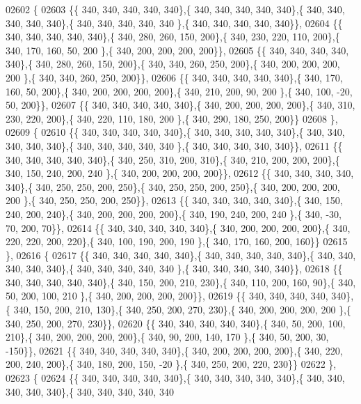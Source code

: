 \begin{DoxyCode}
02602 \{
02603 \{\{ 340, 340, 340, 340, 340\},\{ 340, 340, 340, 340, 340\},\{ 340, 340, 340, 340, 340\},\{ 340, 340, 340, 340, 340
      \},\{ 340, 340, 340, 340, 340\}\},
02604 \{\{ 340, 340, 340, 340, 340\},\{ 340, 280, 260, 150, 200\},\{ 340, 230, 220, 110, 200\},\{ 340, 170, 160,  50, 200
      \},\{ 340, 200, 200, 200, 200\}\},
02605 \{\{ 340, 340, 340, 340, 340\},\{ 340, 280, 260, 150, 200\},\{ 340, 340, 260, 250, 200\},\{ 340, 200, 200, 200, 200
      \},\{ 340, 340, 260, 250, 200\}\},
02606 \{\{ 340, 340, 340, 340, 340\},\{ 340, 170, 160,  50, 200\},\{ 340, 200, 200, 200, 200\},\{ 340, 210, 200,  90, 200
      \},\{ 340, 100, -20,  50, 200\}\},
02607 \{\{ 340, 340, 340, 340, 340\},\{ 340, 200, 200, 200, 200\},\{ 340, 310, 230, 220, 200\},\{ 340, 220, 110, 180, 200
      \},\{ 340, 290, 180, 250, 200\}\}
02608 \},
02609 \{
02610 \{\{ 340, 340, 340, 340, 340\},\{ 340, 340, 340, 340, 340\},\{ 340, 340, 340, 340, 340\},\{ 340, 340, 340, 340, 340
      \},\{ 340, 340, 340, 340, 340\}\},
02611 \{\{ 340, 340, 340, 340, 340\},\{ 340, 250, 310, 200, 310\},\{ 340, 210, 200, 200, 200\},\{ 340, 150, 240, 200, 240
      \},\{ 340, 200, 200, 200, 200\}\},
02612 \{\{ 340, 340, 340, 340, 340\},\{ 340, 250, 250, 200, 250\},\{ 340, 250, 250, 200, 250\},\{ 340, 200, 200, 200, 200
      \},\{ 340, 250, 250, 200, 250\}\},
02613 \{\{ 340, 340, 340, 340, 340\},\{ 340, 150, 240, 200, 240\},\{ 340, 200, 200, 200, 200\},\{ 340, 190, 240, 200, 240
      \},\{ 340, -30,  70, 200,  70\}\},
02614 \{\{ 340, 340, 340, 340, 340\},\{ 340, 200, 200, 200, 200\},\{ 340, 220, 220, 200, 220\},\{ 340, 100, 190, 200, 190
      \},\{ 340, 170, 160, 200, 160\}\}
02615 \},
02616 \{
02617 \{\{ 340, 340, 340, 340, 340\},\{ 340, 340, 340, 340, 340\},\{ 340, 340, 340, 340, 340\},\{ 340, 340, 340, 340, 340
      \},\{ 340, 340, 340, 340, 340\}\},
02618 \{\{ 340, 340, 340, 340, 340\},\{ 340, 150, 200, 210, 230\},\{ 340, 110, 200, 160,  90\},\{ 340,  50, 200, 100, 210
      \},\{ 340, 200, 200, 200, 200\}\},
02619 \{\{ 340, 340, 340, 340, 340\},\{ 340, 150, 200, 210, 130\},\{ 340, 250, 200, 270, 230\},\{ 340, 200, 200, 200, 200
      \},\{ 340, 250, 200, 270, 230\}\},
02620 \{\{ 340, 340, 340, 340, 340\},\{ 340,  50, 200, 100, 210\},\{ 340, 200, 200, 200, 200\},\{ 340,  90, 200, 140, 170
      \},\{ 340,  50, 200,  30, -150\}\},
02621 \{\{ 340, 340, 340, 340, 340\},\{ 340, 200, 200, 200, 200\},\{ 340, 220, 200, 240, 200\},\{ 340, 180, 200, 150, -20
      \},\{ 340, 250, 200, 220, 230\}\}
02622 \},
02623 \{
02624 \{\{ 340, 340, 340, 340, 340\},\{ 340, 340, 340, 340, 340\},\{ 340, 340, 340, 340, 340\},\{ 340, 340, 340, 340, 340

\end{DoxyCode}
